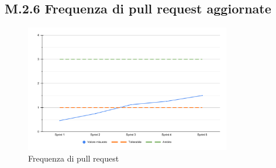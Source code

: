 \subsection{M.2.6 Frequenza di pull request aggiornate}
\begin{figure}[H]
    \centering
    \includegraphics[width=0.8\textwidth]{assets/frequenza_pull_request.pdf}
    \caption{Frequenza di pull request}
\end{figure}